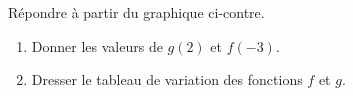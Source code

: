 
\begin{exercice}\label{exoSeconde-0072}


    \begin{multicols}{2}
        \begin{center}
            
        \end{center}

        \columnbreak

        Répondre à partir du graphique ci-contre.
        \begin{enumerate}
            \item
                Donner les valeurs de \( g(2)\) et \( f(-3)\).
            \item
                Dresser le tableau de variation des fonctions \( f\) et \( g\).
        \end{enumerate}

    \end{multicols}

\end{exercice}
